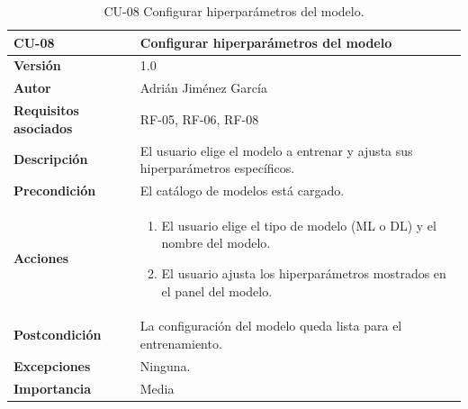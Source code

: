 \begin{table}[p]
	\centering
	\begin{tabularx}{\linewidth}{ p{} X }
		\toprule
		\textbf{CU-08}    & \textbf{Configurar hiperparámetros del modelo}\\
		\toprule
		\textbf{Versión}              & 1.0 \\
		\textbf{Autor}                & Adrián Jiménez García \\
		\textbf{Requisitos asociados} & RF-05, RF-06, RF-08 \\
		\textbf{Descripción}          & El usuario elige el modelo a entrenar y ajusta sus hiperparámetros específicos. \\
		\textbf{Precondición}         & El catálogo de modelos está cargado. \\
		\textbf{Acciones}             &
		\begin{enumerate}
			\def\labelenumi{\arabic{enumi}.}
			\tightlist
			\item El usuario elige el tipo de modelo (ML o DL) y el nombre del modelo.
			\item El usuario ajusta los hiperparámetros mostrados en el panel del modelo.
		\end{enumerate}\\
		\textbf{Postcondición}        & La configuración del modelo queda lista para el entrenamiento. \\
		\textbf{Excepciones}          & Ninguna. \\
		\textbf{Importancia}          & Media \\
		\bottomrule
	\end{tabularx}
	\caption{CU-08 Configurar hiperparámetros del modelo.}
\end{table}


